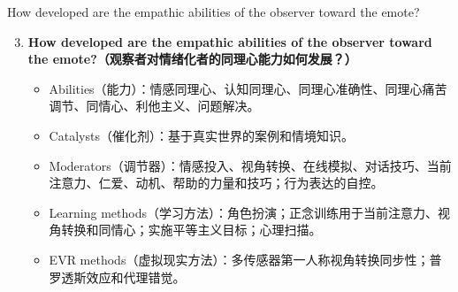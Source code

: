 \documentclass[aspectratio=169,xcolor=dvipsnames]{beamer}
\begin{document}
\begin{frame}{How developed are the empathic abilities of the observer toward the emote?}
    \begin{enumerate}
        \setcounter{enumi}{2}
        \item \textbf{How developed are the empathic abilities of the observer toward the emote?（观察者对情绪化者的同理心能力如何发展？）}
        \begin{itemize}
            \item Abilities（能力）：情感同理心、认知同理心、同理心准确性、同理心痛苦调节、同情心、利他主义、问题解决。
            \item Catalysts（催化剂）：基于真实世界的案例和情境知识。
            \item Moderators（调节器）：情感投入、视角转换、在线模拟、对话技巧、当前注意力、仁爱、动机、帮助的力量和技巧；行为表达的自控。
            \item Learning methods（学习方法）：角色扮演；正念训练用于当前注意力、视角转换和同情心；实施平等主义目标；心理扫描。
            \item EVR methods（虚拟现实方法）：多传感器第一人称视角转换同步性；普罗透斯效应和代理错觉。
        \end{itemize}
    \end{enumerate}
\end{frame}



    
\end{document}
